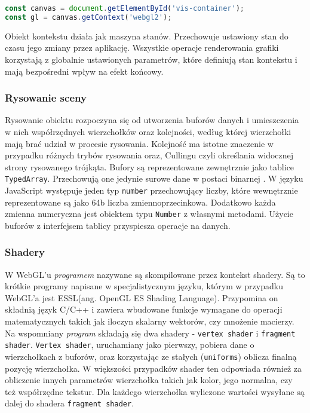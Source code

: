 \begin{lstlisting}[language=javascript, label={lst:webglContext}, caption={Pobranie kontekstu API WebGL do zmiennej}]
const canvas = document.getElementById('vis-container');
const gl = canvas.getContext('webgl2');
\end{lstlisting}

Obiekt kontekstu działa jak maszyna stanów. Przechowuje ustawiony stan do czasu jego zmiany przez aplikację. Wszystkie operacje renderowania grafiki korzystają z globalnie ustawionych parametrów, które definiują stan kontekstu i mają bezpośredni wpływ na efekt końcowy\cite[Rozdział 1]{RealTime3DGraphics}.

\subsubsection{Rysowanie sceny}

Rysowanie obiektu rozpoczyna się od utworzenia buforów danych i umieszczenia w nich współrzędnych wierzchołków oraz kolejności, według której wierzchołki mają brać udział w procesie rysowania. Kolejność ma istotne znaczenie w przypadku różnych trybów rysowania oraz, Cullingu czyli określania widocznej strony rysowanego trójkąta. Bufory są reprezentowane zewnętrznie jako tablice \texttt{TypedArray}. Przechowują one jedynie surowe dane w postaci binarnej \cite{TypedArrays}. W języku JavaScript występuje jeden typ \texttt{number} przechowujący liczby, które wewnętrznie reprezentowane są jako 64b liczba zmiennoprzecinkowa. Dodatkowo każda zmienna numeryczna jest obiektem typu \texttt{Number} z własnymi metodami. Użycie buforów z interfejsem tablicy przyspiesza operacje na danych.

\subsubsection{Shadery}

W WebGL'u \textit{programem} nazywane są skompilowane przez kontekst shadery. Są to krótkie programy napisane w specjalistycznym języku, którym w przypadku WebGL'a jest ESSL(ang. OpenGL ES Shading Language). Przypomina on składnią język C/C++\cite{ESSL} i zawiera wbudowane funkcje wymagane do operacji matematycznych takich jak iloczyn skalarny wektorów, czy mnożenie macierzy. Na wspomniany \textit{program} składają się dwa shadery - \texttt{vertex shader} i \texttt{fragment shader}. \texttt{Vertex shader}, uruchamiany jako pierwszy, pobiera dane o wierzchołkach z buforów, oraz korzystając ze stałych (\texttt{uniforms}) oblicza finalną pozycję wierzchołka. W większości przypadków shader ten odpowiada również za obliczenie innych parametrów wierzchołka takich jak kolor, jego normalna, czy też współrzędne tekstur. Dla każdego wierzchołka wyliczone wartości wysyłane są dalej do shadera \texttt{fragment shader}.

